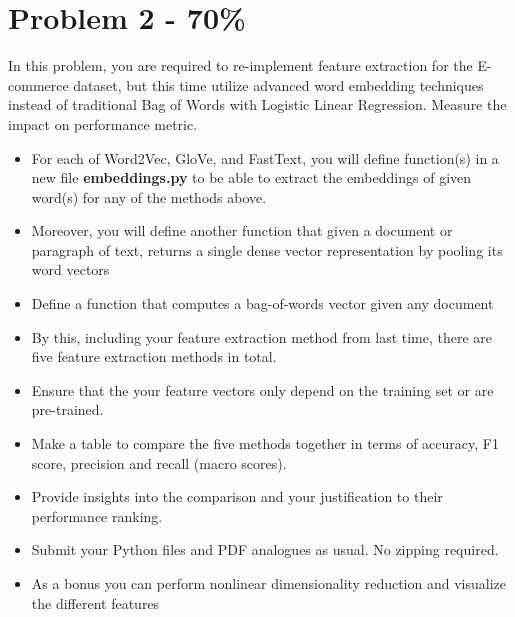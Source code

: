 \documentclass{article}
\begin{document}
\section*{Problem 2 - 70\%}
In this problem, you are required to re-implement feature extraction for the E-commerce dataset, but this time utilize advanced word embedding techniques instead of traditional Bag of Words with Logistic Linear Regression. Measure the impact on performance metric.
\begin{itemize}
    \item For each of Word2Vec, GloVe, and FastText, you will define function(s) in a new file \textbf{embeddings.py} to be able to extract the embeddings of given word(s) for any of the methods above.
    \item Moreover, you will define another function that given a document or paragraph of text, returns a single dense vector representation by pooling its word vectors 
    \item Define a function that computes a bag-of-words vector given any document
    \item By this, including your feature extraction method from last time, there are five feature extraction methods in total.
    \item Ensure that the your feature vectors only depend on the training set or are pre-trained.
    \item Make a table to compare the five methods together in terms of accuracy, F1 score, precision and recall (macro scores).
    \item Provide insights into the comparison and your justification to their performance ranking.
    \item Submit your Python files and PDF analogues as usual. No zipping required.
    \item As a bonus you can perform nonlinear dimensionality reduction and visualize the different features
\end{itemize}
\end{document}
